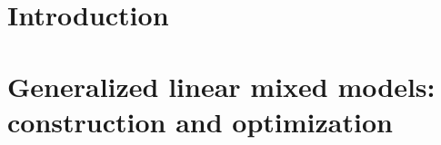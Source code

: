 \documentclass[12pt, %
               openright, %
               oneside, %
               a4paper, %
               chapter=TITLE, %
               section=TITLE, %
               brazil,
               english %
]{abntex2}
\begin{document}
\listoftables*
\cleardoublepage
\makeatletter
\renewcommand\numberline[1]{
	\leftskip -0.7em
	\rightskip 1.6em
	\parfillskip -\rightskip
	\parindent 0em
	\@tempdima 2.0em
	\vspace{0em}
  \advance\leftskip \@tempdima \null\nobreak\hskip -\leftskip
	ALGORITHM \normalfont #1 ~~ }
\makeatother
\listofalgorithms
\cleardoublepage
\makeatletter
\def\numberline#1{\hb@xt@\@tempdima{#1\hfil}}
\makeatother
\tableofcontents*
\cleardoublepage
\textual
\chapter{Introduction}
\label{cap:intro}

\chapter{Generalized linear mixed models: construction and optimization}
\label{cap:methods}

\end{document}
